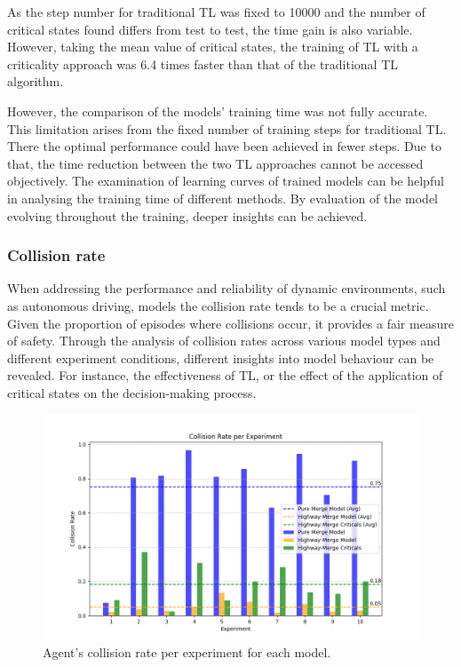 As the step number for traditional TL was fixed to 10000 and the number of critical states found differs from test to test, the time gain is also variable. However, taking the mean value of critical states, the training of TL with a criticality approach was 6.4 times faster than that of the traditional TL algorithm.

However, the comparison of the models' training time was not fully accurate. This limitation arises from the fixed number of training steps for traditional TL. There the optimal performance could have been achieved in fewer steps. Due to that, the time reduction between the two TL approaches cannot be accessed objectively. The examination of learning curves of trained models can be helpful in analysing the training time of different methods. By evaluation of the model evolving throughout the training, deeper insights can be achieved.

\subsubsection{Collision rate}\label{sec:collision_rate}

When addressing the performance and reliability of dynamic environments, such as autonomous driving, models the collision rate tends to be a crucial metric. Given the proportion of episodes where collisions occur, it provides a fair measure of safety. Through the analysis of collision rates across various model types and different experiment conditions, different insights into model behaviour can be revealed. For instance, the effectiveness of TL, or the effect of the application of critical states on the decision-making process.

\begin{figure}[H]
    \centering
    \includegraphics[width=\textwidth]{images/Collision_rate.png}
    \caption{Agent's collision rate per experiment for each model.}
    \label{fig:collision_rate_plot}
\end{figure}

